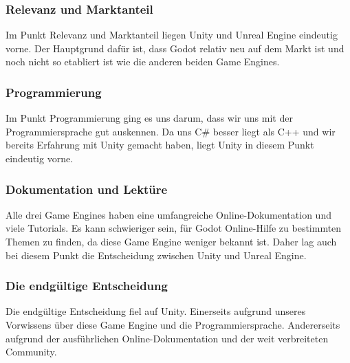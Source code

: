 \subsubsection{Relevanz und Marktanteil}
Im Punkt Relevanz und Marktanteil liegen Unity und Unreal Engine eindeutig vorne. Der Hauptgrund dafür ist, dass Godot relativ neu auf dem Markt ist und noch nicht so etabliert ist wie die anderen beiden Game Engines.

\subsubsection{Programmierung}
Im Punkt Programmierung ging es uns darum, dass wir uns mit der Programmiersprache gut auskennen. Da uns C\# besser liegt als C++ und wir bereits Erfahrung mit Unity gemacht haben, liegt Unity in diesem Punkt eindeutig vorne.

\subsubsection{Dokumentation und Lektüre}
Alle drei Game Engines haben eine umfangreiche Online-Dokumentation und viele Tutorials. Es kann schwieriger sein, für Godot Online-Hilfe zu bestimmten Themen zu finden, da diese Game Engine weniger bekannt ist. Daher lag auch bei diesem Punkt die Entscheidung zwischen Unity und Unreal Engine.

\subsubsection{Die endgültige Entscheidung}
Die endgültige Entscheidung fiel auf Unity. Einerseits aufgrund unseres Vorwissens über diese Game Engine und die Programmiersprache. Andererseits aufgrund der ausführlichen Online-Dokumentation und der weit verbreiteten Community.
